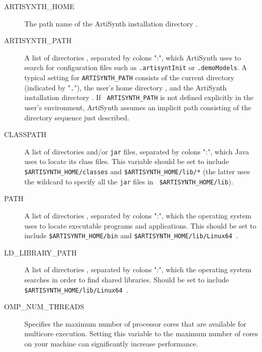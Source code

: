 \documentclass{article}
\def\SEP{/}
\def\ARCH{Linux64 }
\def\directory{directory }
\def\directories{directories }
\begin{document}
\begin{description}

\item[ARTISYNTH\_HOME]\mbox{}
 
The path name of the ArtiSynth installation \directory.

\item[ARTISYNTH\_PATH]\mbox{}

A list of \directories, separated by colons ":", which ArtiSynth
uses to search for configuration files such as {\tt .artisyntInit} or
{\tt .demoModels}.  A typical setting for {\tt ARTISYNTH\_PATH}
consists of the current \directory (indicated by "{\tt .}"), the user's
home \directory, and the ArtiSynth installation \directory. If {\tt
ARTISYNTH\_PATH} is not defined explicitly in the user's environment,
ArtiSynth assumes an implicit path consisting of the \directory
sequence just described.

\item[CLASSPATH]\mbox{}

A list of \directories and/or {\tt jar} files, separated by
colons ":", which Java uses to locate its class files. This
variable should be set to include {\tt \$ARTISYNTH\_HOME\SEP classes}
and {\tt \$ARTISYNTH\_HOME\SEP lib\SEP *} (the latter uses the
wildcard {\tt *} to specify all the {\tt jar} files in {\tt
\$ARTISYNTH\_HOME\SEP lib}).

\item[PATH]\mbox{}
 
A list of \directories, separated by colons ":", which the
operating system uses to locate executable programs and
applications. This should be set to include {\tt \$ARTISYNTH\_HOME\SEP bin}
and {\tt \$ARTISYNTH\_HOME\SEP lib\SEP \ARCH}.

\item[LD\_LIBRARY\_PATH]\mbox{}

A list of \directories, separated by colons
":", which the operating system searches in order to find shared libraries.
Should be set to include {\tt \$ARTISYNTH\_HOME\SEP lib\SEP \ARCH}.

\item[OMP\_NUM\_THREADS]\mbox{}
 
Specifies the maximum number of processor cores that are available for
multicore execution. Setting this variable to the maximum number of
cores on your machine can significantly increase performance.

\end{description}
\end{document}
